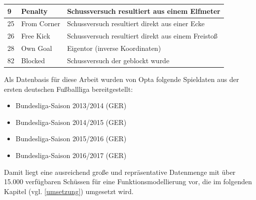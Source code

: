 \tablelasttail{}
\begin{center}%
\begin{supertabular}{ | P{2cm} | P{3cm} | P{5cm} |}
\vspace*{1mm}9 	& \vspace*{1mm}Penalty  	& 	Schussversuch resultiert aus einem Elfmeter\\
\hline
\vspace*{1mm}25	& \vspace*{1mm}From Corner  	& Schussversuch resultiert direkt aus einer Ecke 	\\
\hline
\vspace*{1mm}26	& \vspace*{1mm}Free Kick  	& Schussversuch resultiert direkt aus einem Freistoß  	\\
\hline
\vspace*{1mm}28	& \vspace*{1mm}Own Goal  	& Eigentor (inverse Koordinaten) 	\\
\hline
\vspace*{1mm}82	& \vspace*{1mm}Blocked  	& Schussversuch der geblockt wurde 	\\
\hline	
\end{supertabular}
\end{center}

Als Datenbasis für diese Arbeit wurden von Opta folgende Spieldaten aus der ersten deutschen Fußballliga bereitgestellt:

\begin{itemize}
\item Bundesliga-Saison 2013/2014 (GER)
\item Bundesliga-Saison 2014/2015 (GER)
\item Bundesliga-Saison 2015/2016 (GER)
\item Bundesliga-Saison 2016/2017 (GER)
\end{itemize}

Damit liegt eine ausreichend große und repräsentative Datenmenge mit über 15.000 verfügbaren Schüssen für eine Funktionsmodellierung vor, die im folgenden Kapitel (vgl. \vref{umsetzung}) umgesetzt wird.

